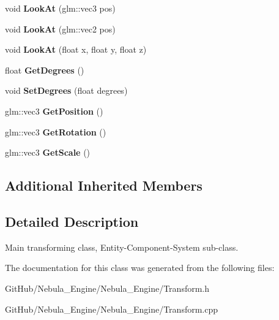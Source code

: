 \begin{DoxyCompactItemize}
void {\bfseries Look\+At} (glm\+::vec3 pos)
\item 
\mbox{\label{class_transform_adeff66582d2ad2a21bd9e2d7ea07536c}} 
void {\bfseries Look\+At} (glm\+::vec2 pos)
\item 
\mbox{\label{class_transform_a2d6e608921f1b972617f525fb1914ccb}} 
void {\bfseries Look\+At} (float x, float y, float z)
\item 
\mbox{\label{class_transform_aad7c9224a597cbfc4a54b78188711dd2}} 
float {\bfseries Get\+Degrees} ()
\item 
\mbox{\label{class_transform_a371321acb164088b107e2e26fc01740e}} 
void {\bfseries Set\+Degrees} (float degrees)
\item 
\mbox{\label{class_transform_ab56d0806d3d2d67a0587c7ffebf0b2d0}} 
glm\+::vec3 {\bfseries Get\+Position} ()
\item 
\mbox{\label{class_transform_a5af4d340711239a3517813e9122c6065}} 
glm\+::vec3 {\bfseries Get\+Rotation} ()
\item 
\mbox{\label{class_transform_a28a37980813cba4e8bada11d5ee6d070}} 
glm\+::vec3 {\bfseries Get\+Scale} ()
\end{DoxyCompactItemize}
\subsection*{Additional Inherited Members}


\subsection{Detailed Description}
Main transforming class, Entity-\/\+Component-\/\+System sub-\/class. 

The documentation for this class was generated from the following files\+:\begin{DoxyCompactItemize}
\item 
Git\+Hub/\+Nebula\+\_\+\+Engine/\+Nebula\+\_\+\+Engine/Transform.\+h\item 
Git\+Hub/\+Nebula\+\_\+\+Engine/\+Nebula\+\_\+\+Engine/Transform.\+cpp\end{DoxyCompactItemize}
